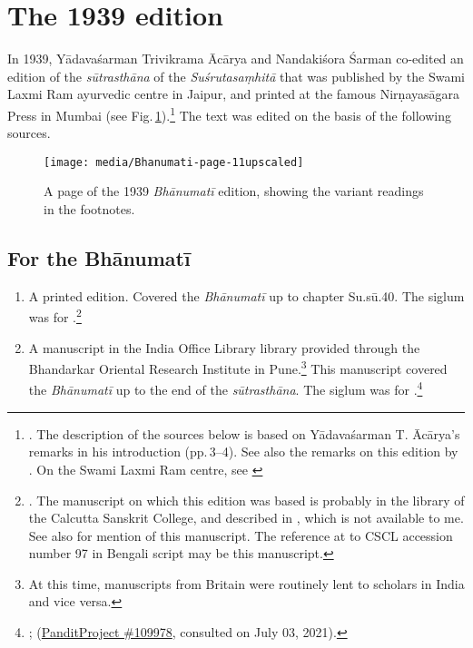 \section{The 1939 edition}        
\label{1939edition}

In 1939, Yādavaśarman Trivikrama Ācārya and Nandakiśora Śarman co-edited an
edition of the \emph{sūtrasthāna} of the \emph{Suśrutasaṃhitā} that was 
published
by the Swami Laxmi Ram ayurvedic centre in Jaipur, and printed at the famous
Nirṇayasāgara Press in Mumbai (see 
Fig.\,\ref{bhanumati}).\footnote{\cite{acar-1939}.  The description of 
the sources 
below is based on Yādavaśarman T. Ācārya's  remarks in his introduction 
(pp.\,3--4). See also the remarks on this edition by
\citet[7]{kleb-2021a}.  On the Swami Laxmi Ram
centre, see \cite{hofe-2007}} The text was edited on the basis of the following 
sources.

\begin{figure}[p]
    \centering
    \texttt{[image: media/Bhanumati-page-11upscaled]}
    \caption{A page of the 1939 \emph{Bhānumatī} edition, showing the variant 
        readings in the footnotes.}
    \label{bhanumati}
\end{figure}


\subsection{For the Bhānumatī}

\begin{enumerate}
    \item A printed edition.  Covered the \emph{Bhānumatī} up to chapter Su.sū.40.
    The siglum was  for .\footnote{\cite{sena-1886}.  
    The
    manuscript on which this edition was based is probably in the library of the
    Calcutta Sanskrit College, and described in \cite[v.\,X.1]{sast-1917}, which
    is not available to me.  See also \cite[IB, 495, n.\,57]{meul-hist} for
    mention of this manuscript.  The reference at \cite[217]{rao-sans} to CSCL
    accession number 97 in Bengali script may be this manuscript.}
    
    \item A manuscript in the India Office Library library provided through the
    Bhandarkar Oriental Research Institute in Pune.\footnote{At this time,
    manuscripts from Britain were routinely lent to scholars in India and vice
    versa.} This manuscript covered the \emph{Bhānumatī} up to the end of the
    \emph{sūtrasthāna}.  The siglum was  for
    .\footnote{\cite{PP109978}; 
    (\href{panditproject.org/entity/109978/manuscript}{PanditProject \#109978},
    consulted on July 03, 2021).}
\end{enumerate}

